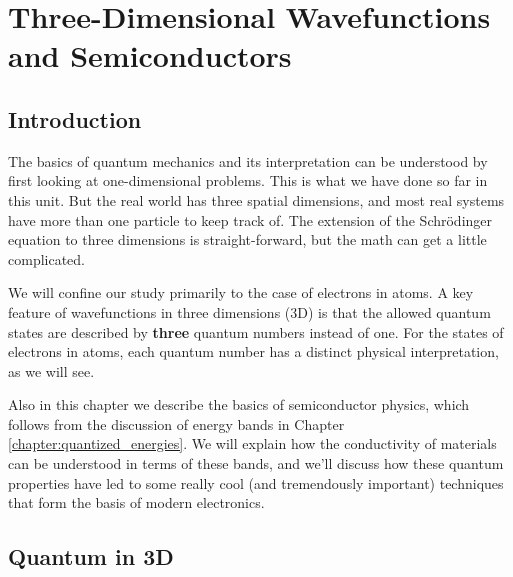 \chapter[3D Wavefunctions and Semiconductors]{Three-Dimensional Wavefunctions and Semiconductors}
\label{chapter:3D_and_semiconductors}

\section{Introduction}
\indent The basics of quantum mechanics and its interpretation can be
understood by first looking at one-dimensional problems.  This is what
we have done so far in this unit.  But the real world has three spatial
dimensions, and most real systems have more than one particle to keep
track of.  The extension of the Schr\"{o}dinger equation to three
dimensions is straight-forward, but the math can get a little
complicated.

We will confine our study primarily to the case of electrons in atoms.  
A key feature of wavefunctions in
three dimensions (3D) is that the allowed quantum states are described by
{\bf three} quantum numbers instead of one.  For the states of
electrons in atoms, each quantum number has a distinct physical
interpretation, as we will see.

Also in this chapter we describe the basics of semiconductor physics,
which follows from the discussion of energy bands in Chapter
\ref{chapter:quantized_energies}. We will explain how the conductivity
of materials can be understood in terms of these bands, and we'll
discuss how these quantum properties have led to some really
cool (and tremendously important) techniques that form the basis
of modern electronics.

\section{Quantum in 3D}

